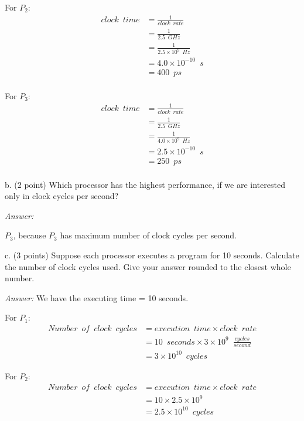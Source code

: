 \documentclass[11pt]{article}
\newcommand{\answer}{{\color{red}\textit{Answer: }}}
\begin{document}
For $P_2$:
\begin{align*}
    clock\enspace time &= \frac{1}{clock \enspace rate} \\
                       &= \frac{1}{2.5 \enspace GHz} \\
                       &= \frac{1}{2.5 \times 10^{9} \enspace Hz} \\
                       &= 4.0 \times 10^{-10} \enspace s \\
                       &= 400 \enspace ps \\
\end{align*}

For $P_3$:
\begin{align*}
    clock \enspace time &= \frac{1}{clock \enspace rate} \\
                        &= \frac{1}{2.5 \enspace GHz} \\
                        &= \frac{1}{4.0 \times 10^{9} \enspace Hz} \\
                        &= 2.5 \times 10^{-10} \enspace s \\
                        &= 250 \enspace ps \\
\end{align*}

b. (2 point) Which processor has the highest performance, if we are interested only in clock cycles per second?

\answer

$P_3$, because $P_3$ has maximum number of clock cycles per second.

c. (3 points) Suppose each processor executes a program for 10 seconds.  Calculate the number of clock cycles used. Give your answer rounded to the closest whole number.

\answer
We have the executing time = 10 seconds.

For $P_1$:
\begin{align*}
    Number \enspace of \enspace clock \enspace cycles 
                    &= execution \enspace time \times clock \enspace rate\\
                    &= 10 \enspace seconds \times 3 \times 10^{9} \enspace \frac{cycles}{second}\\ 
                    &= 3 \times 10^{10} \enspace cycles
\end{align*}

For $P_2$:
\begin{align*}
    Number \enspace of \enspace clock \enspace cycles
                    &= execution \enspace time \times clock \enspace rate\\
                    &= 10 \times 2.5 \times 10^{9}\\ 
                    &= 2.5 \times 10^{10} \enspace cycles
\end{align*}
\end{document}
